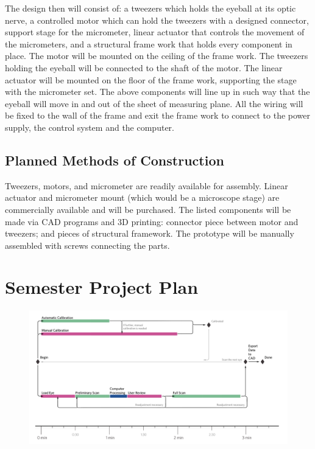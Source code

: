 \documentclass{article}
\begin{document}
The design then will consist of: a tweezers which holds the eyeball at its optic nerve, a controlled motor which can hold the tweezers with a designed connector, support stage for the micrometer, linear actuator that controls the movement of the micrometers, and a structural frame work that holds every component in place. The motor will be mounted on the ceiling of the frame work. The tweezers holding the eyeball will be connected to the shaft of the motor. The linear actuator will be mounted on the floor of the frame work, supporting the stage with the micrometer set. The above components will line up in such way that the eyeball will move in and out of the sheet of measuring plane. All the wiring will be fixed to the wall of the frame and exit the frame work to connect to the power supply, the control system and the computer.

\subsection{Planned Methods of Construction}
Tweezers, motors, and micrometer are readily available for assembly. Linear actuator and micrometer mount (which would be a microscope stage) are commercially available and will be purchased. The listed components will be made via CAD programs and 3D printing: connector piece between motor and tweezers; and pieces of structural framework. The prototype will be manually assembled with screws connecting the parts.

\section{Semester Project Plan}

\begin{figure}[p]
  \centering
  \includegraphics[width=\linewidth]{../img/usage_flow}
  \label{fig:usage}
\end{figure}
\end{document}
